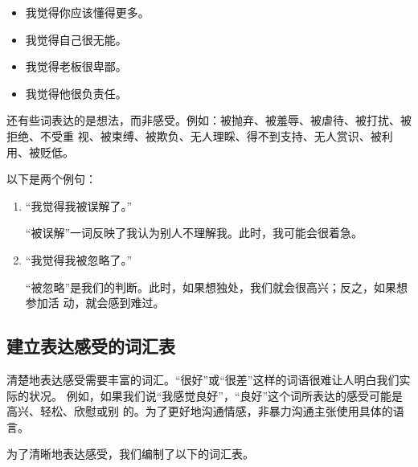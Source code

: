 \documentclass{ctexart}
\begin{document}
\begin{itemize}
	\item 我觉得你应该懂得更多。
	\item 我觉得自己很无能。
	\item 我觉得老板很卑鄙。
	\item 我觉得他很负责任。
\end{itemize}

还有些词表达的是想法，而非感受。例如：被抛弃、被羞辱、被虐待、被打扰、被拒绝、不受重
视、被束缚、被欺负、无人理睬、得不到支持、无人赏识、被利用、被贬低。

以下是两个例句：

\begin{enumerate}[label=\Alph*.,labelsep=1pt,parsep=0.5em]
	\item ``我觉得我被误解了。''

	      ``被误解''一词反映了我认为别人不理解我。此时，我可能会很着急。
	\item ``我觉得我被忽略了。''

	      ``被忽略''是我们的判断。此时，如果想独处，我们就会很高兴；反之，如果想参加活
	      动，就会感到难过。
\end{enumerate}


\subsection{建立表达感受的词汇表}

清楚地表达感受需要丰富的词汇。``很好''或``很差''这样的词语很难让人明白我们实际的状况。
例如，如果我们说``我感觉良好''，``良好''这个词所表达的感受可能是高兴、轻松、欣慰或别
的。为了更好地沟通情感，非暴力沟通主张使用具体的语言。

为了清晰地表达感受，我们编制了以下的词汇表。
\end{document}

